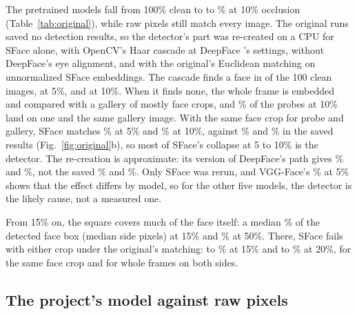 The pretrained models fall from 100\% clean to  to \% at 10\% occlusion (Table~\ref{tab:original}), while raw pixels still match every image. The original runs saved no detection results, so the detector's part was re-created on a CPU for SFace alone, with OpenCV's Haar cascade at DeepFace 's settings, without DeepFace's eye alignment, and with the original's Euclidean matching on unnormalized SFace embeddings. The cascade finds a face in  of the 100 clean images,  at 5\%, and  at 10\%. When it finds none, the whole frame is embedded and compared with a gallery of mostly face crops, and \% of the probes at 10\% land on one and the same gallery image. With the same face crop for probe and gallery, SFace matches \% at 5\% and \% at 10\%, against \% and \% in the saved results (Fig.~\ref{fig:original}b), so most of SFace's collapse at 5 to 10\% is the detector. The re-creation is approximate: its version of DeepFace's path gives \% and \%, not the saved \% and \%. Only SFace was rerun, and VGG-Face's \% at 5\% shows that the effect differs by model, so for the other five models, the detector is the likely cause, not a measured one.

From 15\% on, the square covers much of the face itself: a median \% of the detected face box (median side  pixels) at 15\% and \% at 50\%. There, SFace fails with either crop under the original's matching:  to \% at 15\% and  to \% at 20\%, for the same face crop and for whole frames on both sides.

\subsection{The project's model against raw pixels}

